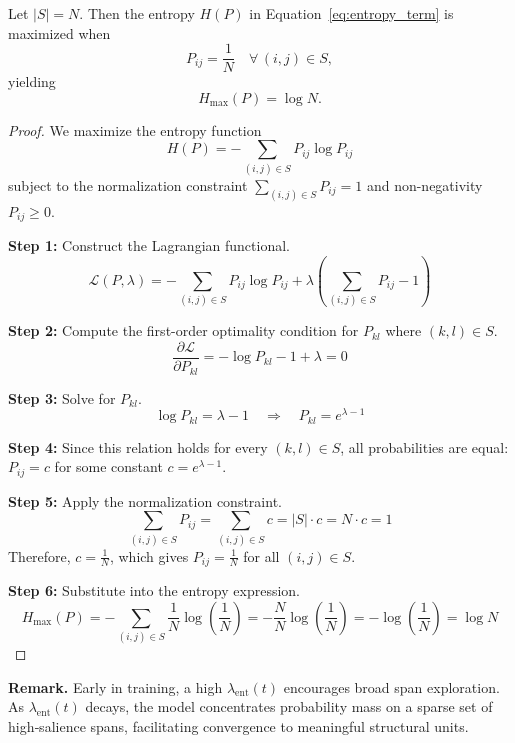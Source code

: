 \begin{proposition}
	\label{prop:span_entropy_bound}
	Let \(|S|=N\).  Then the entropy \(H(P)\) in Equation~\eqref{eq:entropy_term} is maximized when
	\begin{equation}
		P_{ij} = \frac{1}{N}
		\quad\forall\,(i,j)\in S,
		\label{eq:uniform_P}
	\end{equation}
	yielding
	\begin{equation}
		H_{\max}(P) = \log N.
		\label{eq:max_entropy}
	\end{equation}
\end{proposition}
\begin{proof}
	We maximize the entropy function
	\[
	H(P) = -\sum_{(i,j)\in S} P_{ij} \log P_{ij}
	\]
	subject to the normalization constraint \(\sum_{(i,j)\in S} P_{ij} = 1\) and non-negativity \(P_{ij} \geq 0\).
	
	\textbf{Step 1:} Construct the Lagrangian functional.
	\[
	\mathcal{L}(P, \lambda) = -\sum_{(i,j)\in S} P_{ij} \log P_{ij} + \lambda\left(\sum_{(i,j)\in S} P_{ij} - 1\right)
	\]
	
	\textbf{Step 2:} Compute the first-order optimality condition for \(P_{kl}\) where \((k,l) \in S\).
	\[
	\frac{\partial \mathcal{L}}{\partial P_{kl}} = -\log P_{kl} - 1 + \lambda = 0
	\]
	
	\textbf{Step 3:} Solve for \(P_{kl}\).
	\[
	\log P_{kl} = \lambda - 1 \quad \Rightarrow \quad P_{kl} = e^{\lambda - 1}
	\]
	
	\textbf{Step 4:} Since this relation holds for every \((k,l) \in S\), all probabilities are equal: \(P_{ij} = c\) for some constant \(c = e^{\lambda - 1}\).
	
	\textbf{Step 5:} Apply the normalization constraint.
	\[
	\sum_{(i,j)\in S} P_{ij} = \sum_{(i,j)\in S} c = |S| \cdot c = N \cdot c = 1
	\]
	Therefore, \(c = \frac{1}{N}\), which gives \(P_{ij} = \frac{1}{N}\) for all \((i,j) \in S\).
	
	\textbf{Step 6:} Substitute into the entropy expression.
	\[
	H_{\max}(P) = -\sum_{(i,j)\in S} \frac{1}{N} \log\left(\frac{1}{N}\right) = -\frac{N}{N} \log\left(\frac{1}{N}\right) = -\log\left(\frac{1}{N}\right) = \log N
	\]
\end{proof}

\noindent\textbf{Remark.} Early in training, a high \(\lambda_{\mathrm{ent}}(t)\) encourages broad span exploration.  As \(\lambda_{\mathrm{ent}}(t)\) decays, the model concentrates probability mass on a sparse set of high‐salience spans, facilitating convergence to meaningful structural units.
